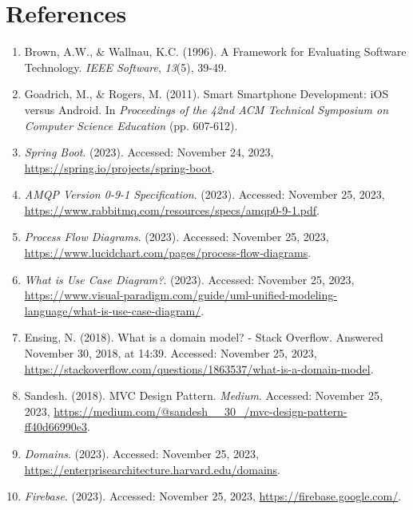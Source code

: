 

\section*{References}

\begin{enumerate}
    \item Brown, A.W., & Wallnau, K.C. (1996). A Framework for Evaluating Software Technology. \textit{IEEE Software}, \textit{13}(5), 39-49.

    \item Goadrich, M., & Rogers, M. (2011). Smart Smartphone Development: iOS versus Android. In \textit{Proceedings of the 42nd ACM Technical Symposium on Computer Science Education} (pp. 607-612).

    \item \textit{Spring Boot}. (2023). Accessed: November 24, 2023, \url{https://spring.io/projects/spring-boot}.

    \item \textit{AMQP Version 0-9-1 Specification}. (2023). Accessed: November 25, 2023, \url{https://www.rabbitmq.com/resources/specs/amqp0-9-1.pdf}.

    \item \textit{Process Flow Diagrams}. (2023). Accessed: November 25, 2023, \url{https://www.lucidchart.com/pages/process-flow-diagrams}.

    \item \textit{What is Use Case Diagram?}. (2023). Accessed: November 25, 2023, \url{https://www.visual-paradigm.com/guide/uml-unified-modeling-language/what-is-use-case-diagram/}.

    \item Ensing, N. (2018). What is a domain model? - Stack Overflow. Answered November 30, 2018, at 14:39. Accessed: November 25, 2023, \url{https://stackoverflow.com/questions/1863537/what-is-a-domain-model}.

    \item Sandesh. (2018). MVC Design Pattern. \textit{Medium}. Accessed: November 25, 2023, \url{https://medium.com/@sandesh__30_/mvc-design-pattern-ff40d66990e3}.

    \item \textit{Domains}. (2023). Accessed: November 25, 2023, \url{https://enterprisearchitecture.harvard.edu/domains}.

    \item \textit{Firebase}. (2023). Accessed: November 25, 2023, \url{https://firebase.google.com/}.


\end{enumerate}
